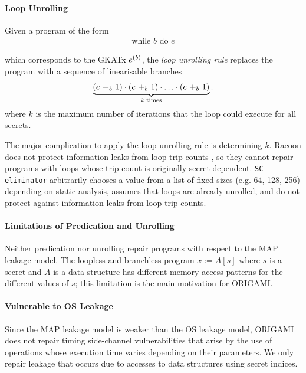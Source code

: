 {%

\paragraph*{Loop Unrolling} Given a program of the form 
\begin{align*}
    \text{while $b$ do $e$}
\end{align*}
    
which corresponds to the GKATx $\iteration{b}{e}$, the \emph{loop unrolling rule} replaces the program with a sequence of linearisable branches 
\begin{align*}
    \underbrace{\left(\branch{b}{e}{1}\right)\cdot\left(\branch{b}{e}{1}\right)\cdot\ldots\cdot\left(\branch{b}{e}{1}\right)}_\text{$k$ times}.
    \end{align*}
where $k$ is the maximum number of iterations that the loop could execute for all secrets. 

The major complication to apply the loop unrolling rule is determining $k$. Racoon does not protect information leaks from loop trip counts \cite{Racoon}, so they cannot repair programs with loops whose trip count is originally secret dependent. \texttt{SC-eliminator} arbitrarily chooses a value from a list of fixed sizes (e.g. 64, 128, 256) depending on static analysis, \cite{MSESC} assumes that loops are already unrolled, and \cite{Racoon} do not protect against information leaks from loop trip counts. 

\paragraph*{Limitations of Predication and Unrolling}
Neither predication nor unrolling repair programs with respect to the MAP leakage model. The loopless and branchless program $x:=A[s]$ where $s$ is a secret and $A$ is a data structure has different memory access patterns for the different values of $s$; this limitation is the main motivation for ORIGAMI.

\paragraph*{Vulnerable to OS Leakage} Since the MAP leakage model is weaker than the OS leakage model, ORIGAMI does not repair timing side-channel vulnerabilities that arise by the use of operations whose execution time varies depending on their parameters. We only repair leakage that occurs due to accesses to data structures using secret indices.

}

